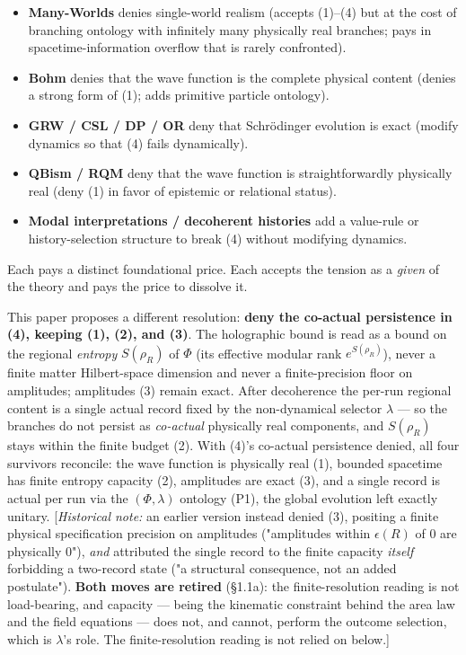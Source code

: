 \documentclass[11pt,a4paper]{article}
\begin{document}
\begin{itemize}
  \item \textbf{Many-Worlds} denies single-world realism (accepts (1)–(4) but at the cost of branching ontology with infinitely many physically real branches; pays in spacetime-information overflow that is rarely confronted).
  \item \textbf{Bohm} denies that the wave function is the complete physical content (denies a strong form of (1); adds primitive particle ontology).
  \item \textbf{GRW / CSL / DP / OR} deny that Schrödinger evolution is exact (modify dynamics so that (4) fails dynamically).
  \item \textbf{QBism / RQM} deny that the wave function is straightforwardly physically real (deny (1) in favor of epistemic or relational status).
  \item \textbf{Modal interpretations / decoherent histories} add a value-rule or history-selection structure to break (4) without modifying dynamics.
\end{itemize}

Each pays a distinct foundational price. Each accepts the tension as a \emph{given} of the theory and pays the price to dissolve it.

This paper proposes a different resolution: \textbf{deny the co-actual persistence in (4), keeping (1), (2), and (3)}. The holographic bound is read as a bound on the regional \emph{entropy} $S(\rho_R)$ of $\Phi$ (its effective modular rank $e^{S(\rho_R)}$), never a finite matter Hilbert-space dimension and never a finite-precision floor on amplitudes; amplitudes (3) remain exact. After decoherence the per-run regional content is a single actual record fixed by the non-dynamical selector $\lambda$ — so the branches do not persist as \emph{co-actual} physically real components, and $S(\rho_R)$ stays within the finite budget (2). With (4)'s co-actual persistence denied, all four survivors reconcile: the wave function is physically real (1), bounded spacetime has finite entropy capacity (2), amplitudes are exact (3), and a single record is actual per run via the $(\Phi,\lambda)$ ontology (P1), the global evolution left exactly unitary. [\emph{Historical note:} an earlier version instead denied (3), positing a finite physical specification precision on amplitudes ("amplitudes within $\epsilon(R)$ of $0$ are physically $0$"), \emph{and} attributed the single record to the finite capacity \emph{itself} forbidding a two-record state ("a structural consequence, not an added postulate"). \textbf{Both moves are retired} (§1.1a): the finite-resolution reading is not load-bearing, and capacity — being the kinematic constraint behind the area law and the field equations — does not, and cannot, perform the outcome selection, which is $\lambda$'s role. The finite-resolution reading is not relied on below.]
\end{document}
